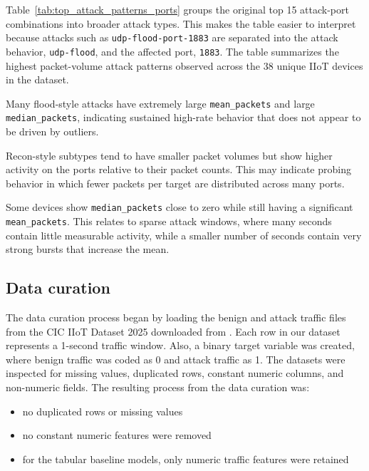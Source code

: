 \documentclass[final,5p,times,twocolumn]{elsarticle}
\begin{document}
Table~\ref{tab:top_attack_patterns_ports} groups the original top 15 attack-port combinations into broader attack types. This makes the table easier to interpret because attacks such as \texttt{udp-flood-port-1883} are separated into the attack behavior, \texttt{udp-flood}, and the affected port, \texttt{1883}. The table summarizes the highest packet-volume attack patterns observed across the 38 unique IIoT devices in the dataset.

Many flood-style attacks have extremely large \texttt{mean\_packets} and large \texttt{median\_packets}, indicating sustained high-rate behavior that does not appear to be driven by outliers.
        
Recon-style subtypes tend to have smaller packet volumes but show higher activity on the ports relative to their packet counts. This may indicate probing behavior in which fewer packets per target are distributed across many ports.
        
Some devices show \texttt{median\_packets} close to zero while still having a significant \texttt{mean\_packets}. This relates to sparse attack windows, where many seconds contain little measurable activity, while a smaller number of seconds contain very strong bursts that increase the mean.

\subsection{Data curation}
\label{data-curation} 
The data curation process began by loading the benign and attack traffic files from the CIC IIoT Dataset 2025 downloaded from {\citep{unb_iiot_2025}}. Each row in our dataset represents a 1-second traffic window. Also, a binary target variable was created, where benign traffic was coded as 0 and attack traffic as 1. The datasets were inspected for missing values, duplicated rows, constant numeric columns, and non-numeric fields. The resulting process from the data curation was: 
\begin{itemize}
    \item no duplicated rows or missing values
    \item no constant numeric features were removed
    \item for the tabular baseline models, only numeric traffic features were retained
\end{itemize}
\end{document}
